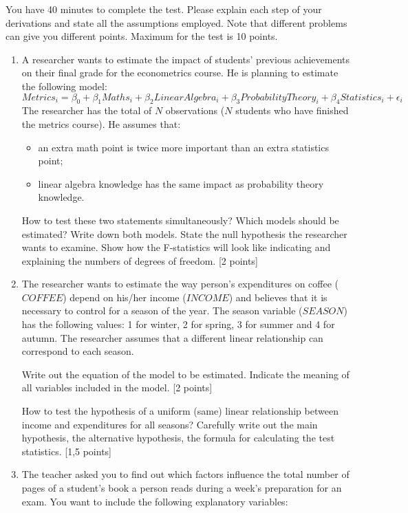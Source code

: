 You have 40 minutes to complete the test. Please explain each step of your derivations and state all the assumptions employed. 
Note that different problems can give you different points. Maximum for the test is 10 points.  

\begin{enumerate}
    \item A researcher wants to estimate the impact of students' previous achievements on their final grade for the econometrics course. He is planning to estimate the following model:
\[
    Metrics_i = \beta_0 + \beta_1 Maths_i + \beta_2 LinearAlgebra_i + \beta_3 ProbabilityTheory_i + 
    \beta_4 Statistics_i + \epsilon_i
\]
The researcher has the total of $N$ observations ($N$ students who have finished the metrics course). He assumes that:
\begin{itemize}
    \item an extra math point is twice more important than an extra statistics point;
    \item linear algebra knowledge has the same impact as probability theory knowledge.
\end{itemize}

How to test these two statements simultaneously? Which models should be estimated? Write down both models. State the null hypothesis the researcher wants to examine. Show how the F-statistics will look like indicating and explaining the numbers of degrees of freedom. [2 points]

\item The researcher wants to estimate the way person's expenditures on coffee ($COFFEE$) 
depend on his/her income ($INCOME$) and believes that it is necessary to control for a season of the year. 
The season variable ($SEASON$) has the following values: 1 for winter, 2 for spring, 3 for summer and 4 for autumn. 
The researcher assumes that a different linear relationship can correspond to each season.

Write out the equation of the model to be estimated. Indicate the meaning of all variables included in the model. [2 points]

How to test the hypothesis of a uniform (same) linear relationship between income and expenditures for all seasons? 
Carefully write out the main hypothesis, the alternative hypothesis, the formula for calculating the test statistics. [1,5 points]


\item The teacher asked you to find out which factors influence the total number of pages 
of a student's book a person reads during a week's preparation for an exam. 
You want to include the following explanatory variables:


\end{enumerate}
